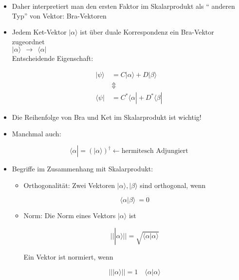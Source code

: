 \documentclass[10pt,article,colorback,accentcolor=tud9d]{scrartcl}
\begin{document}
\begin{itemize}
\item Daher interpretiert man den ersten Faktor im Skalarprodukt als "`
anderen Typ"' von Vektor: Bra-Vektoren
\item Jedem Ket-Vektor $\left|\right.\alpha\rangle $ ist über duale Korrespondenz 
ein Bra-Vektor zugeordnet\\
$\left|\right.\alpha\rangle  \ \ \rightarrow \ \ \langle \alpha\left|\right.$\\
Entscheidende Eigenschaft:
 
\begin{equation}
\begin{aligned}
\left|\right.\psi\rangle  \ &= C \left|\right.\alpha\rangle  +D\left|\right.\beta\rangle \\
&\Updownarrow\\
\langle \psi\left|\right.&=C^*\langle \alpha\left|\right. +D^* \langle \beta\left|\right.
\end{aligned}
\end{equation}
 
\item Die Reihenfolge von Bra und Ket im Skalarprodukt ist wichtig!
\item Manchmal auch:
 
\begin{equation}
\langle \alpha\left|\right.=(\left|\right.\alpha\rangle )^\dagger \leftarrow \text{hermitesch 
Adjungiert}
\end{equation}
 
\item Begriffe im Zusammenhang mit Skalarprodukt:
\begin{itemize}
\item Orthogonalität: Zwei Vektoren $\left|\right.\alpha\rangle , \left|\right.\beta\rangle 
$ sind orthogonal, wenn
 
\begin{equation}
\langle \alpha\left|\right.\beta\rangle  \ =0
\end{equation}
 
\item Norm: Die Norm eines Vektors $\left|\right.\alpha\rangle $ ist 
 
\begin{equation}
\left|\right|\left|\right.\alpha\rangle \left|\right|=\sqrt{\langle \alpha\left|\right.
\alpha\rangle }
\end{equation}
 
Ein Vektor ist normiert, wenn
 
\begin{equation}
\left|\right|\left|\right.\alpha\rangle \left|\right| =1 \quad \langle \alpha\left|\right.
\alpha\rangle 
\end{equation}
 

\end{itemize}
\end{itemize}
\end{document}
